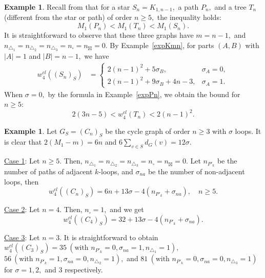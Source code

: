 \documentclass[12pt,a4paper,reqno]{amsart}
\numberwithin{equation}{section}
\theoremstyle{plain}
\theoremstyle{definition}
\newtheorem{example}[theorem]{Example}
\newcommand{\<}{\langle}
\renewcommand{\>}{\rangle}
\begin{document}
\begin{example}
Recall from \cite{GutmanDas2004} that for a star $S_n=K_{1,n-1},$ a path $P_n,$ and a tree $T_n$ (different from the star or path) of order $n \geq 5,$ the inequality holds:
\[
M_1(P_n) < M_1(T_n) < M_1(S_n).
\]
It is straightforward to observe that these three graphs have $m=n-1,$ and $n_{\triangle_1}=n_{\triangle_2}=n_{\triangle_3}=n_\square = n_\boxtimes =0.$  By Example~\ref{expKmn}, for parts $(A,B)$ with $|A|=1$ and $|B|=n-1,$ we have
\begin{align*}
w_4^{cl}((S_n)_S) 
&=\begin{cases}
2(n-1)^2 +5\sigma_B, & \sigma_A=0, \\
2(n-1)^2 +9\sigma_B + 4n-3, & \sigma_A=1.
\end{cases}
\end{align*}
When $\sigma=0,$ by the formula in Example~\ref{expPn}, we obtain the bound for $n\geq 5:$
\[
2(3n-5) < w_4^{cl}(T_n) < 2(n-1)^2.
\]
\end{example}


\begin{example}
Let $G_S=(C_n)_S$ be the cycle graph of order $n \geq 3$ with $\sigma$ loops. It is clear that $2(M_1-m)=6n$ and $6\sum_{v\in S}d_G(v)=12\sigma.$

\underline{Case 1}: Let $n\geq 5.$ Then, $n_{\triangle_1}=n_{\triangle_2}=n_{\triangle_3}=n_{\square} =n_{\boxtimes}=0.$  Let $n_{P'_k}$ be the number of paths of adjacent $k$-loops, and $\sigma_{na}$ be the number of non-adjacent loops, then %
\[
w_4^{cl}((C_n)_S) = 6n + 13\sigma - 4\left( n_{P'_k} + \sigma_{na} \right), \quad n\geq 5.
\]

\underline{Case 2}: Let $n=4.$ Then, $n_\square=1,$ and we get
\[
w_4^{cl}((C_4)_S) = 32 + 13\sigma - 4\left(n_{P'_k} + \sigma_{na} \right).
\]

\underline{Case 3}: Let $n=3.$ It is straightforward to obtain $w_4^{cl}((C_3)_S)=35 \:(\text{with }n_{P'_k}=0, \sigma_{na}=1, n_{\triangle_1}=1),$ $56 \:(\text{with }n_{P'_k}=1, \sigma_{na}=0, n_{\triangle_2}=1),$ and $81 \:(\text{with } n_{P'_k}=0, \sigma_{na}=0, n_{\triangle_3}=1)$ for $\sigma=1,2,$ and $3$ respectively.
\end{example}
\end{document}
